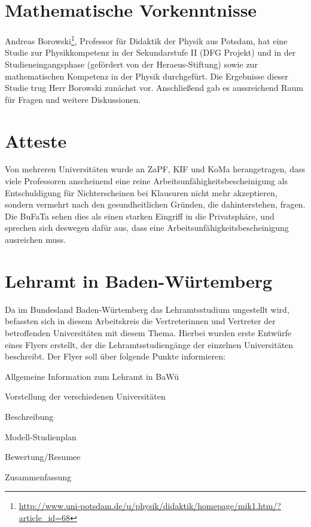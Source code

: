 \documentclass{scrartcl}
\begin{document}
\section*{Mathematische Vorkenntnisse}

Andreas Borowski\footnote{\href{http://www.uni-potsdam.de/u/physik/didaktik/homepage/mik1.htm/?article_id=68}{\url{http://www.uni-potsdam.de/u/physik/didaktik/homepage/mik1.htm/?article_id=68}}},
Professor für Didaktik der Physik aus Potsdam, hat eine Studie zur Physikkompetenz
in der Sekundarstufe II (DFG Projekt) und in der Studieneingangsphase
(gefördert von der Heraeus-Stiftung) sowie zur mathematischen Kompetenz in
der Physik durchgefürt. Die Ergebnisse dieser Studie trug Herr Borowski
zunächst vor. Anschließend gab es aussreichend Raum für Fragen und weitere
Diskussionen.

\section*{Atteste}

Von mehreren Universitäten wurde an ZaPF, KIF und KoMa herangetragen, dass
viele Professoren anscheinend eine reine Arbeitsunfähigkeitsbescheinigung als
Entschuldigung für Nichterscheinen bei Klausuren nicht mehr akzeptieren,
sondern vermehrt nach den gesundheitlichen Gründen, die dahinterstehen, fragen.
Die BuFaTa sehen dies als einen starken Eingriff in die Privatsphäre, und
sprechen sich deswegen dafür aus, dass eine Arbeitsunfähigkeitsbescheinigung
ausreichen muss.

\section*{Lehramt in Baden-Würtemberg}

Da im Bundesland Baden-Würtemberg das Lehramtsstudium ungestellt wird,
befassten sich in diesem Arbeitskreis die Vertreterinnen und Vertreter der
betroffenden Universitäten mit diesem Thema. Hierbei wurden erste Entwürfe
eines Flyers erstellt, der die Lehramtsstudiengänge der einzelnen Universitäten
beschreibt. Der Flyer soll über folgende Punkte informieren:

\begin{compactenum}
	\item Allgemeine Information zum Lehramt in BaWü
	\item Vorstellung der verschiedenen Universitäten
		\begin{compactenum}
		\item Beschreibung
		\item Modell-Studienplan
		\item Bewertung/Resumee
		\end{compactenum}
	\item Zusammenfassung
\end{compactenum}
\end{document}
